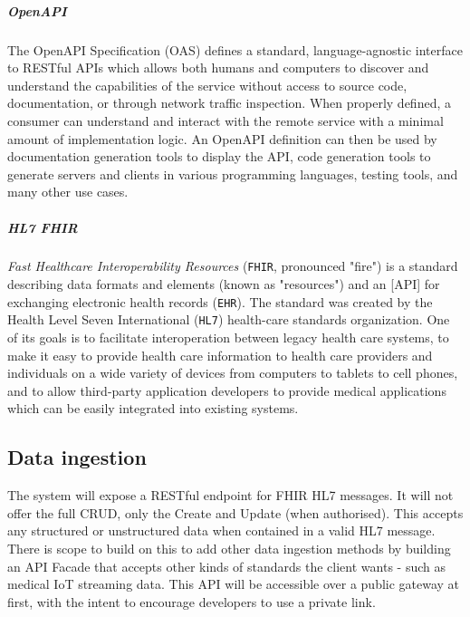\documentclass[10pt]{article}
\begin{document}
\subparagraph{OpenAPI}
The OpenAPI Specification (OAS) defines a standard, language-agnostic interface to RESTful APIs which allows both humans and computers to discover and understand the capabilities of the service without access to source code, documentation, or through network traffic inspection. When properly defined, a consumer can understand and interact with the remote service with a minimal amount of implementation logic. An OpenAPI definition can then be used by documentation generation tools to display the API, code generation tools to generate servers and clients in various programming languages, testing tools, and many other use cases. \cite{openapi}

\subparagraph{HL7 FHIR}
\textit{Fast Healthcare Interoperability Resources} (\texttt{FHIR}, pronounced "fire") is a standard describing data formats and elements (known as "resources") and an [API] for exchanging electronic health records (\texttt{EHR}). The standard was created by the Health Level Seven International (\texttt{HL7}) health-care standards organization. One of its goals is to facilitate interoperation between legacy health care systems, to make it easy to provide health care information to health care providers and individuals on a wide variety of devices from computers to tablets to cell phones, and to allow third-party application developers to provide medical applications which can be easily integrated into existing systems. \cite{fhir}

\subsection{Data ingestion}
The system will expose a RESTful endpoint for FHIR HL7 messages. It will not offer the full CRUD, only the Create and Update (when authorised). This accepts any structured or unstructured data when contained in a valid HL7 message. There is scope to build on this to add other data ingestion methods by building an API Facade that accepts other kinds of standards the client wants - such as medical IoT streaming data. This API will be accessible over a public gateway at first, with the intent to encourage developers to use a private link.
\end{document}
